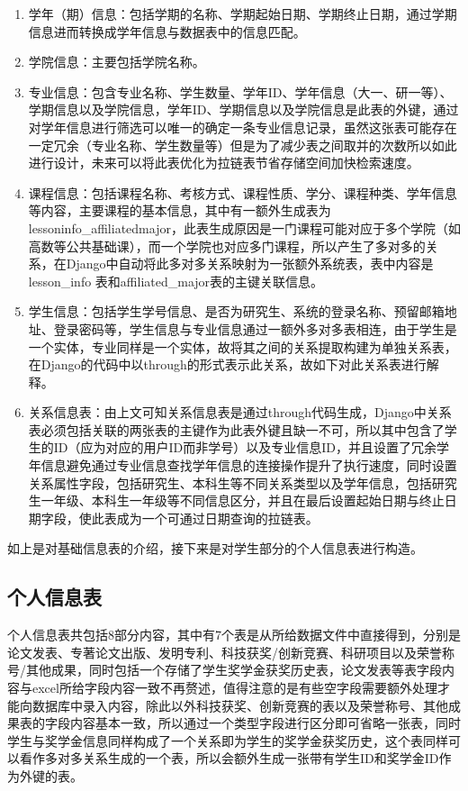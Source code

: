 \begin{enumerate}
  \item 学年（期）信息：包括学期的名称、学期起始日期、学期终止日期，通过学期信息进而转换成学年信息与数据表中的信息匹配。
  \item 学院信息：主要包括学院名称。
  \item 专业信息：包含专业名称、学生数量、学年ID、学年信息（大一、研一等）、学期信息以及学院信息，学年ID、学期信息以及学院信息是此表的外键，通过对学年信息进行筛选可以唯一的确定一条专业信息记录，虽然这张表可能存在一定冗余（专业名称、学生数量等）但是为了减少表之间取并的次数所以如此进行设计，未来可以将此表优化为拉链表节省存储空间加快检索速度。
  \item 课程信息：包括课程名称、考核方式、课程性质、学分、课程种类、学年信息等内容，主要课程的基本信息，其中有一额外生成表为lessoninfo\_affiliatedmajor，此表生成原因是一门课程可能对应于多个学院（如高数等公共基础课），而一个学院也对应多门课程，所以产生了多对多的关系，在Django中自动将此多对多关系映射为一张额外系统表，表中内容是lesson\_info 表和affiliated\_major表的主键关联信息。
  \item 学生信息：包括学生学号信息、是否为研究生、系统的登录名称、预留邮箱地址、登录密码等，学生信息与专业信息通过一额外多对多表相连，由于学生是一个实体，专业同样是一个实体，故将其之间的关系提取构建为单独关系表，在Django的代码中以through的形式表示此关系，故如下对此关系表进行解释。
  \item 关系信息表：由上文可知关系信息表是通过through代码生成，Django中关系表必须包括关联的两张表的主键作为此表外键且缺一不可，所以其中包含了学生的ID（应为对应的用户ID而非学号）以及专业信息ID，并且设置了冗余学年信息避免通过专业信息查找学年信息的连接操作提升了执行速度，同时设置关系属性字段，包括研究生、本科生等不同关系类型以及学年信息，包括研究生一年级、本科生一年级等不同信息区分，并且在最后设置起始日期与终止日期字段，使此表成为一个可通过日期查询的拉链表。
\end{enumerate}

如上是对基础信息表的介绍，接下来是对学生部分的个人信息表进行构造。

\subsection{个人信息表}

个人信息表共包括8部分内容，其中有7个表是从所给数据文件中直接得到，分别是论文发表、专著论文出版、发明专利、科技获奖/创新竞赛、科研项目以及荣誉称号/其他成果，同时包括一个存储了学生奖学金获奖历史表，论文发表等表字段内容与excel所给字段内容一致不再赘述，值得注意的是有些空字段需要额外处理才能向数据库中录入内容，除此以外科技获奖、创新竞赛的表以及荣誉称号、其他成果表的字段内容基本一致，所以通过一个类型字段进行区分即可省略一张表，同时学生与奖学金信息同样构成了一个关系即为学生的奖学金获奖历史，这个表同样可以看作多对多关系生成的一个表，所以会额外生成一张带有学生ID和奖学金ID作为外键的表。

